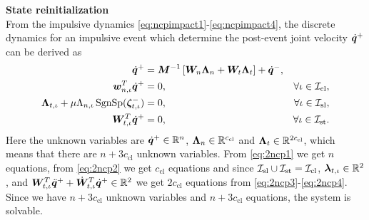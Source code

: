 \documentclass[../DC2017114Bouma.tex]{subfiles}
\begin{document}
\textbf{State reinitialization}\\
From the impulsive dynamics \eqref{eq:ncpimpact1}-\eqref{eq:ncpimpact4}, the discrete dynamics for an impulsive event which determine the post-event joint velocity $\dot{{\boldsymbol{q}}}^+$ can be derived as
\begin{align}
\dot{{\boldsymbol{q}}}^+ &= {\boldsymbol{M}}^{-1}\left[{\boldsymbol{W}}_{n}\boldsymbol{\Lambda}_{n} + {\boldsymbol{W}}_{t}\boldsymbol{\Lambda}_{t}\right] + \dot{{\boldsymbol{q}}}^-, \label{eq:2ncp1}\\
{\boldsymbol{w}}^T_{n,\iota}\dot{{\boldsymbol{q}}}^+ &= 0, &\forall \iota\in\mathcal{I}_{\text{cl}},\label{eq:2ncp2}\\
\boldsymbol{\Lambda}_{t,\iota} + \mu\Lambda_{n,\iota}\operatorname{\text{SgnSp}}(\boldsymbol{\zeta}^-_{t,\iota})&= 0, &\forall \iota\in\mathcal{I}_{\text{sl}},\label{eq:2ncp3}\\
{\boldsymbol{W}}^T_{t,\iota}\dot{{\boldsymbol{q}}}^+ &= 0, &\forall \iota\in\mathcal{I}_{\text{st}}.\label{eq:2ncp4}
\end{align}
Here the unknown variables are $\dot{{\boldsymbol{q}}}^+\in\mathbb{R}^{n}$, $\boldsymbol{\Lambda}_{n}\in\mathbb{R}^{c_{\text{cl}}}$ and $\boldsymbol{\Lambda}_{t}\in\mathbb{R}^{2c_{\text{cl}}}$, which means that there are $n+3c_{\text{cl}}$ unknown variables. From \eqref{eq:2ncp1} we get $n$ equations, from \eqref{eq:2ncp2} we get $c_{\text{cl}}$ equations and since $\mathcal{I}_{\text{sl}}\cup\mathcal{I}_{\text{st}}=\mathcal{I}_{\text{cl}}$, $\boldsymbol{\lambda}_{t,\iota}\in\mathbb{R}^2$, and ${\boldsymbol{W}}^T_{t,\iota}\ddot{{\boldsymbol{q}}}^+ + \dot{{\boldsymbol{W}}}^T_{t,\iota}\dot{{\boldsymbol{q}}}^+ \in\mathbb{R}^2$ we get $2c_{\text{cl}}$ equations from \eqref{eq:2ncp3}-\eqref{eq:2ncp4}. Since we have $n+3c_{\text{cl}}$ unknown variables and $n+3c_{\text{cl}}$ equations, the system is solvable.
\end{document}
